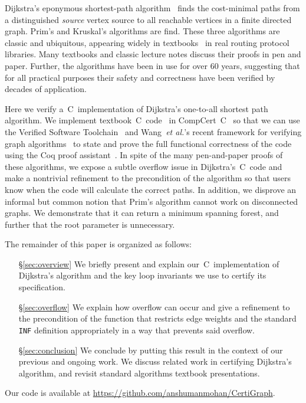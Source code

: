 Dijkstra's eponymous shortest-path algorithm~\cite{DBLP:journals/nm/Dijkstra59} finds
the cost-minimal paths from a distinguished \emph{source} vertex
source to all reachable vertices in a finite directed graph. Prim's and Kruskal's algorithms are find.
These three algorithms are classic and ubiquitous, appearing widely in textbooks~\cite{clrs} in real routing protocol libraries. Many textbooks and classic lecture notes discuss their proofs in pen and paper. Further, the algorithms have been in
use for over $60$ years, suggesting that for all practical purposes
their safety and correctness have been verified by decades of application.


Here we verify a~C~implementation of Dijkstra's one-to-all shortest path algorithm.
We implement textbook~C~code~\cite{clrs} in CompCert~C~\cite{leroy:compcert} so that
we can use the Verified Software Toolchain~\cite{appel:programlogics} and
Wang~\emph{et al.}'s recent framework for verifying graph algorithms~\cite{DBLP:journals/pacmpl/WangCMH19} to state and prove the full functional
correctness of the code using the Coq proof assistant~\cite{coq}.
In spite of the many pen-and-paper proofs of these algorithms, we expose a subtle overflow issue in Dijkstra's~C~code and make a nontrivial refinement to the precondition of the algorithm so that users know when the code will calculate the correct paths. In addition, we disprove an informal but common notion that Prim's algorithm cannot work on disconnected graphs. We demonstrate that it can return a minimum spanning forest, and further that the root parameter is unnecessary.

The remainder of this paper is organized as follows:
\begin{itemize}
    \item[\S\ref{sec:overview}] We briefly present and explain
    our~C~implementation of Dijkstra's algorithm and the key loop invariants
    we use to certify its specification.
    \item[\S\ref{sec:overflow}] We explain how overflow can occur and give a
    refinement to the precondition of the function that restricts edge weights
    and the standard \texttt{INF} definition
    appropriately in a way that prevents said overflow.
    \item[\S\ref{sec:conclusion}] We conclude by putting this result in the context of our
    previous and ongoing work. We discuss related work in certifying Dijkstra's algorithm, and revisit standard algorithms textbook presentations.
\end{itemize} 

\noindent Our code is available at \url{https://github.com/anshumanmohan/CertiGraph}.
